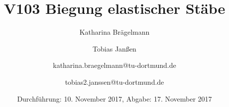 
\title{V103 Biegung elastischer Stäbe}
\author{Katharina Brägelmann \and Tobias Janßen \and katharina.braegelmann@tu-dortmund.de \and tobias2.janssen@tu-dortmund.de}
\date{Durchführung: 10. November 2017, Abgabe: 17. November 2017}
\maketitle

\tableofcontents
